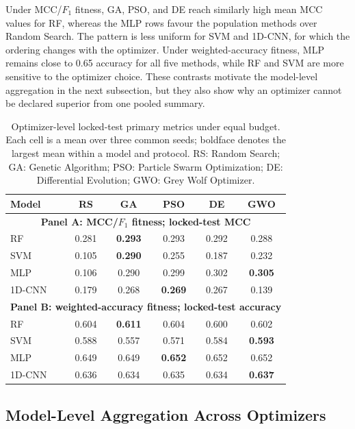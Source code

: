Under MCC/$F_1$ fitness, GA, PSO, and DE reach similarly high mean MCC values for RF, whereas the MLP rows favour the population methods over Random Search. The pattern is less uniform for SVM and 1D-CNN, for which the ordering changes with the optimizer. Under weighted-accuracy fitness, MLP remains close to 0.65 accuracy for all five methods, while RF and SVM are more sensitive to the optimizer choice. These contrasts motivate the model-level aggregation in the next subsection, but they also show why an optimizer cannot be declared superior from one pooled summary.

\begin{table}[htbp]
\centering
\caption{Optimizer-level locked-test primary metrics under equal budget. Each cell is a mean over three common seeds; boldface denotes the largest mean within a model and protocol. RS: Random Search; GA: Genetic Algorithm; PSO: Particle Swarm Optimization; DE: Differential Evolution; GWO: Grey Wolf Optimizer.}
\label{tab:optimizer_primary_metrics}
\footnotesize
\begin{tabular}{lccccc}\toprule
\textbf{Model} & \textbf{RS} & \textbf{GA} & \textbf{PSO} & \textbf{DE} & \textbf{GWO}\\\midrule
\multicolumn{6}{c}{\textbf{Panel A: MCC/$F_1$ fitness; locked-test MCC}}\\\midrule
RF & 0.281 & \textbf{0.293} & 0.293 & 0.292 & 0.288\\
SVM & 0.105 & \textbf{0.290} & 0.255 & 0.187 & 0.232\\
MLP & 0.106 & 0.290 & 0.299 & 0.302 & \textbf{0.305}\\
1D-CNN & 0.179 & 0.268 & \textbf{0.269} & 0.267 & 0.139\\\midrule
\multicolumn{6}{c}{\textbf{Panel B: weighted-accuracy fitness; locked-test accuracy}}\\\midrule
RF & 0.604 & \textbf{0.611} & 0.604 & 0.600 & 0.602\\
SVM & 0.588 & 0.557 & 0.571 & 0.584 & \textbf{0.593}\\
MLP & 0.649 & 0.649 & \textbf{0.652} & 0.652 & 0.652\\
1D-CNN & 0.636 & 0.634 & 0.635 & 0.634 & \textbf{0.637}\\\bottomrule
\end{tabular}
\end{table}

\subsection{Model-Level Aggregation Across Optimizers}


